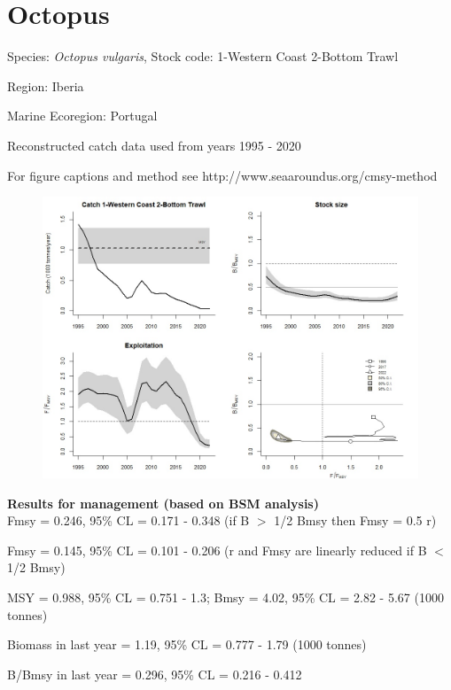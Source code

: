 \documentclass[12pt,a4paper]{article}\usepackage[]{graphicx}\usepackage[]{xcolor}
\begin{document}
    \section*{Octopus}


    Species: \emph{Octopus vulgaris}, Stock code: 1-Western Coast 2-Bottom Trawl

Region: Iberia

Marine Ecoregion: Portugal

Reconstructed catch data used from years 1995 - 2020 

 For figure captions and method see http://www.seaaroundus.org/cmsy-method

    \begin{figure}[ht]
    \centering
    \includegraphics[width=1.00\textwidth ext=.jpg type=jpg]{1-Western Coast 2-Bottom Trawl_MAN.jpg}
    \end{figure}

    \textbf{Results for management (based on BSM analysis)}\\

Fmsy = 0.246, 95\% CL = 0.171 - 0.348 (if B $>$ 1/2 Bmsy then Fmsy = 0.5 r)

Fmsy = 0.145, 95\% CL = 0.101 - 0.206 (r and Fmsy are linearly reduced if B $<$ 1/2 Bmsy)

MSY = 0.988,  95\% CL = 0.751 - 1.3; Bmsy = 4.02,  95\% CL = 2.82 - 5.67 (1000 tonnes)

Biomass in last year = 1.19, 95\% CL = 0.777 - 1.79 (1000 tonnes)

B/Bmsy in last year = 0.296, 95\% CL = 0.216 - 0.412
\end{document}

